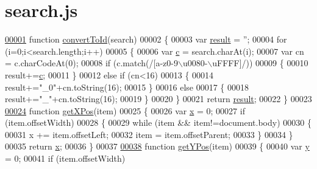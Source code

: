 \hypertarget{search_8js_source}{}\section{search.\+js}
\label{search_8js_source}

\begin{DoxyCode}
\hypertarget{search_8js_source.tex_l00001}{}\hyperlink{search_8js_a196a29bd5a5ee7cd5b485e0753a49e57}{00001} \textcolor{keyword}{function} \hyperlink{search_8js_a196a29bd5a5ee7cd5b485e0753a49e57}{convertToId}(search)
00002 \{
00003   var \hyperlink{sensor_8h_a4c9d9cb8bb9d2b707a152051408f40e5}{result} = \textcolor{stringliteral}{''};
00004   \textcolor{keywordflow}{for} (i=0;i<search.length;i++)
00005   \{
00006     var \hyperlink{jquery_8js_ad171626e81625b5e9f5cb177a3a8fb1c}{c} = search.charAt(i);
00007     var cn = c.charCodeAt(0);
00008     \textcolor{keywordflow}{if} (c.match(/[a-z0-9\(\backslash\)u0080-\(\backslash\)uFFFF]/))
00009     \{
00010       result+=\hyperlink{jquery_8js_ad171626e81625b5e9f5cb177a3a8fb1c}{c};
00011     \}
00012     \textcolor{keywordflow}{else} \textcolor{keywordflow}{if} (cn<16)
00013     \{
00014       result+=\textcolor{stringliteral}{"\_0"}+cn.toString(16);
00015     \}
00016     \textcolor{keywordflow}{else}
00017     \{
00018       result+=\textcolor{stringliteral}{"\_"}+cn.toString(16);
00019     \}
00020   \}
00021   \textcolor{keywordflow}{return} \hyperlink{sensor_8h_a4c9d9cb8bb9d2b707a152051408f40e5}{result};
00022 \}
00023 
\hypertarget{search_8js_source.tex_l00024}{}\hyperlink{search_8js_a76d24aea0009f892f8ccc31d941c0a2b}{00024} \textcolor{keyword}{function} \hyperlink{search_8js_a76d24aea0009f892f8ccc31d941c0a2b}{getXPos}(item)
00025 \{
00026   var \hyperlink{sensor_8h_a6c4b361d72eb3767ba424ac9a6ecf52b}{x} = 0;
00027   \textcolor{keywordflow}{if} (item.offsetWidth)
00028   \{
00029     \textcolor{keywordflow}{while} (item && item!=document.body)
00030     \{
00031       x   += item.offsetLeft;
00032       item = item.offsetParent;
00033     \}
00034   \}
00035   \textcolor{keywordflow}{return} \hyperlink{sensor_8h_a6c4b361d72eb3767ba424ac9a6ecf52b}{x};
00036 \}
00037 
\hypertarget{search_8js_source.tex_l00038}{}\hyperlink{search_8js_a8d7b405228661d7b6216b6925d2b8a69}{00038} \textcolor{keyword}{function} \hyperlink{search_8js_a8d7b405228661d7b6216b6925d2b8a69}{getYPos}(item)
00039 \{
00040   var \hyperlink{sensor_8h_a0ed6a908288e0cd87f79c1b5ab56d07c}{y} = 0;
00041   \textcolor{keywordflow}{if} (item.offsetWidth)

\end{DoxyCode}
